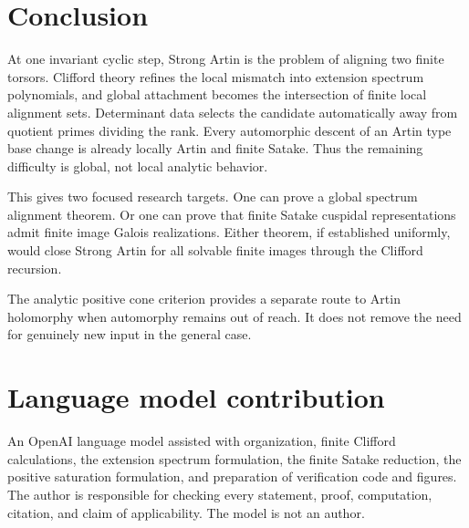 \documentclass{aomart}
\theoremstyle{definition}
\theoremstyle{remark}
\begin{document}
\section{Conclusion}\label{sec:conclusion}

At one invariant cyclic step, Strong Artin is the problem of aligning two finite torsors. Clifford theory refines the local mismatch into extension spectrum polynomials, and global attachment becomes the intersection of finite local alignment sets. Determinant data selects the candidate automatically away from quotient primes dividing the rank. Every automorphic descent of an Artin type base change is already locally Artin and finite Satake. Thus the remaining difficulty is global, not local analytic behavior.

This gives two focused research targets. One can prove a global spectrum alignment theorem. Or one can prove that finite Satake cuspidal representations admit finite image Galois realizations. Either theorem, if established uniformly, would close Strong Artin for all solvable finite images through the Clifford recursion.

The analytic positive cone criterion provides a separate route to Artin holomorphy when automorphy remains out of reach. It does not remove the need for genuinely new input in the general case.

\section*{Language model contribution}
An OpenAI language model assisted with organization, finite Clifford calculations, the extension spectrum formulation, the finite Satake reduction, the positive saturation formulation, and preparation of verification code and figures. The author is responsible for checking every statement, proof, computation, citation, and claim of applicability. The model is not an author.



\end{document}
